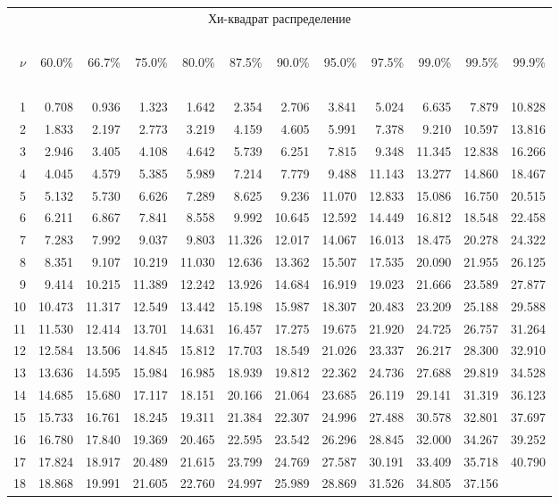 {\begin{center}
\begin{tabular}
      {r@{\ }r@{\ }r@{\ }r@{\ }r@{\ }r@{\ }r@{\ }r@{\ }r@{\ }r@{\ }r@{\ }r}
\multicolumn{12}{c}{Хи-квадрат распределение}\\
\ \\
$\nu$&60.0\%&66.7\%&75.0\%&80.0\%&87.5\%&90.0\%&95.0\%&97.5\%&99.0\%&99.5\%
     &99.9\%\\
\ \\
1&0.708&0.936&1.323&1.642&2.354&2.706&3.841&5.024&6.635&7.879&10.828\\
2&1.833&2.197&2.773&3.219&4.159&4.605&5.991&7.378&9.210&10.597&13.816\\
3&2.946&3.405&4.108&4.642&5.739&6.251&7.815&9.348&11.345&12.838&16.266\\
4&4.045&4.579&5.385&5.989&7.214&7.779&9.488&11.143&13.277&14.860&18.467\\
5&5.132&5.730&6.626&7.289&8.625&9.236&11.070&12.833&15.086&16.750&20.515\\
6&6.211&6.867&7.841&8.558&9.992&10.645&12.592&14.449&16.812&18.548&22.458\\
7&7.283&7.992&9.037&9.803&11.326&12.017&14.067&16.013&18.475&20.278&24.322\\
8&8.351&9.107&10.219&11.030&12.636&13.362&15.507&17.535&20.090&21.955&26.125\\
9&9.414&10.215&11.389&12.242&13.926&14.684&16.919&19.023&21.666&23.589
 &27.877\\
10&10.473&11.317&12.549&13.442&15.198&15.987&18.307&20.483&23.209&25.188
  &29.588\\
11&11.530&12.414&13.701&14.631&16.457&17.275&19.675&21.920&24.725&26.757
  &31.264\\
12&12.584&13.506&14.845&15.812&17.703&18.549&21.026&23.337&26.217&28.300
  &32.910\\
13&13.636&14.595&15.984&16.985&18.939&19.812&22.362&24.736&27.688&29.819
  &34.528\\
14&14.685&15.680&17.117&18.151&20.166&21.064&23.685&26.119&29.141&31.319
  &36.123\\
15&15.733&16.761&18.245&19.311&21.384&22.307&24.996&27.488&30.578&32.801
  &37.697\\
16&16.780&17.840&19.369&20.465&22.595&23.542&26.296&28.845&32.000&34.267
  &39.252\\
17&17.824&18.917&20.489&21.615&23.799&24.769&27.587&30.191&33.409&35.718
  &40.790\\
18&18.868&19.991&21.605&22.760&24.997&25.989&28.869&31.526&34.805&37.156

\end{tabular}
\end{center}}
